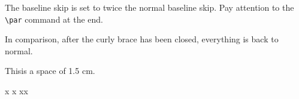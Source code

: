 \documentclass{ctexart}
\begin{document}
{\linespread{1.0}\selectfont
The baseline skip is set to twice
the normal baseline skip.
Pay attention to the \verb|\par|
command at the end. \par}
In comparison, after the
curly brace has been closed,
everything is back to normal.

\quad

This\hspace{1.5cm}is a space
of 1.5 cm.

\quad

x
x
x\hspace{\fill}x
\end{document}
